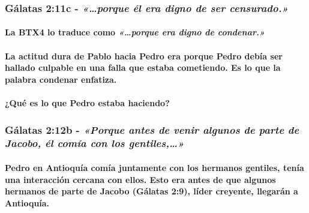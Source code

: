 \documentclass[11a pt,twoside]{article}
\newcommand{\scripture}[1]{%
  {\fontsize{12pt}{16pt}\selectfont\ScriptureFont\itshape #1}%
}
\let\oldsubsubsection\subsubsection
\renewcommand{\subsubsection}{\needspace{4\baselineskip}\oldsubsubsection}
\let\oldparagraph\paragraph
\renewcommand{\paragraph}{\needspace{3\baselineskip}\oldparagraph}
\begin{document}
\subsubsection{\texorpdfstring{Gálatas 2:11c -
\scripture{«…porque él era digno de ser censurado.»}}{Gálatas 2:11c - }}\label{guxe1latas-211c---porque-uxe9l-era-digno-de-ser-censurado.}

\paragraph{\texorpdfstring{La BTX4 lo traduce como
\scripture{«…porque era digno de condenar.»}}{La BTX4 lo traduce como }}\label{la-btx4-lo-traduce-como-porque-era-digno-de-condenar.}

\paragraph{La actitud dura de Pablo hacia Pedro era porque Pedro debía
ser hallado culpable en una falla que estaba cometiendo. Es lo que la
palabra condenar
enfatiza.}\label{la-actitud-dura-de-pablo-hacia-pedro-era-porque-pedro-debuxeda-ser-hallado-culpable-en-una-falla-que-estaba-cometiendo.-es-lo-que-la-palabra-condenar-enfatiza.}

\paragraph{¿Qué es lo que Pedro estaba
haciendo?}\label{quuxe9-es-lo-que-pedro-estaba-haciendo}

\subsubsection{\texorpdfstring{Gálatas 2:12b -
\scripture{«Porque antes de venir algunos de parte de Jacobo, él comía con los gentiles,…»}}{Gálatas 2:12b - }}\label{guxe1latas-212b---porque-antes-de-venir-algunos-de-parte-de-jacobo-uxe9l-comuxeda-con-los-gentiles}

\paragraph{Pedro en Antioquía comía juntamente con los hermanos
gentiles, tenía una interacción cercana con ellos. Esto era antes de que
algunos hermanos de parte de Jacobo (Gálatas 2:9), líder creyente,
llegarán a
Antioquía.}\label{pedro-en-antioquuxeda-comuxeda-juntamente-con-los-hermanos-gentiles-tenuxeda-una-interacciuxf3n-cercana-con-ellos.-esto-era-antes-de-que-algunos-hermanos-de-parte-de-jacobo-guxe1latas-29-luxedder-creyente-llegaruxe1n-a-antioquuxeda.}
\end{document}
